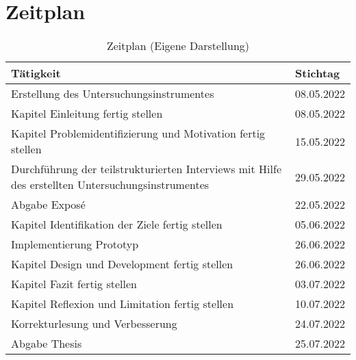 \section{Zeitplan}

\begin{table}[ht]
	\begin{tabular}{@{}p{13cm}p{2cm}@{}}
		\toprule
		\textbf{Tätigkeit}                                                                                & \textbf{Stichtag} \\ \midrule
		Erstellung des Untersuchungsinstrumentes                                                          & 08.05.2022        \\ \midrule
		Kapitel Einleitung fertig stellen                                                                 & 08.05.2022        \\ \midrule
		Kapitel Problemidentifizierung und Motivation fertig stellen                                      & 15.05.2022        \\ \midrule
		Durchführung der teilstrukturierten Interviews mit Hilfe des erstellten Untersuchungsinstrumentes & 29.05.2022        \\ \midrule
		Abgabe Exposé                                                                                     & 22.05.2022        \\ \midrule
		Kapitel Identifikation der Ziele fertig stellen                                                   & 05.06.2022        \\ \midrule
		Implementierung Prototyp                                                                          & 26.06.2022        \\ \midrule
		Kapitel Design und Development fertig stellen                                                     & 26.06.2022        \\ \midrule
		Kapitel Fazit fertig stellen                                                                      & 03.07.2022        \\ \midrule
		Kapitel Reflexion und Limitation fertig stellen                                                   & 10.07.2022        \\ \midrule
		Korrekturlesung und Verbesserung                                                                  & 24.07.2022        \\ \midrule
		Abgabe Thesis                                                                                     & 25.07.2022        \\ \bottomrule
	\end{tabular}
	\caption{\label{tab:time-table}Zeitplan (Eigene Darstellung)}
\end{table}